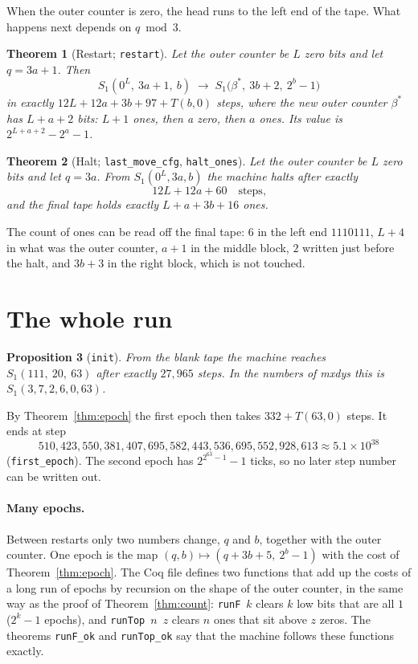 \documentclass[11pt]{article}
\newtheorem{theorem}{Theorem}
\newtheorem{proposition}[theorem]{Proposition}
\theoremstyle{remark}
\newcommand{\coq}[1]{\texttt{#1}}
\begin{document}
When the outer counter is zero, the head runs to the left end of the tape. What
happens next depends on $q \bmod 3$.

\begin{theorem}[Restart; \coq{restart}]\label{thm:restart}
Let the outer counter be $L$ zero bits and let $q = 3a+1$. Then
\[
S_1(0^{L},\ 3a+1,\ b) \;\longrightarrow\; S_1\bigl(\beta^{*},\ 3b+2,\ 2^{b}-1\bigr)
\]
in exactly $12L + 12a + 3b + 97 + T(b,0)$ steps, where the new outer counter
$\beta^{*}$ has $L+a+2$ bits: $L+1$ ones, then a zero, then $a$ ones. Its value
is $2^{L+a+2} - 2^{a} - 1$.
\end{theorem}

\begin{theorem}[Halt; \coq{last\_move\_cfg}, \coq{halt\_ones}]\label{thm:halt}
Let the outer counter be $L$ zero bits and let $q = 3a$. From $S_1(0^{L}, 3a, b)$
the machine halts after exactly
\[
12L + 12a + 60 \quad\text{steps,}
\]
and the final tape holds exactly $L + a + 3b + 16$ ones.
\end{theorem}

The count of ones can be read off the final tape: $6$ in the left end
$1110111$, $L+4$ in what was the outer counter, $a+1$ in the middle block, $2$
written just before the halt, and $3b+3$ in the right block, which is not
touched.

\section{The whole run}

\begin{proposition}[\coq{init}]\label{prop:init}
From the blank tape the machine reaches $S_1(111,\ 20,\ 63)$ after exactly
$27{,}965$ steps. In the numbers of mxdys this is $S_1(3,7,2,6,0,63)$.
\end{proposition}

By Theorem~\ref{thm:epoch} the first epoch then takes
$332 + T(63,0)$ steps. It ends at step
\[
510{,}423{,}550{,}381{,}407{,}695{,}582{,}443{,}536{,}695{,}552{,}928{,}613
\approx 5.1\times 10^{38}
\]
(\coq{first\_epoch}). The second epoch has $2^{2^{63}-1}-1$ ticks, so no later
step number can be written out.

\paragraph{Many epochs.} Between restarts only two numbers change, $q$ and $b$,
together with the outer counter. One epoch is the map
$(q,b)\mapsto(q+3b+5,\ 2^{b}-1)$ with the cost of Theorem~\ref{thm:epoch}. The
Coq file defines two functions that add up the costs of a long run of epochs by
recursion on the shape of the outer counter, in the same way as the proof of
Theorem~\ref{thm:count}: \coq{runF}~$k$ clears $k$ low bits that are all $1$
($2^{k}-1$ epochs), and \coq{runTop}~$n$~$z$ clears $n$ ones that sit above $z$
zeros. The theorems \coq{runF\_ok} and \coq{runTop\_ok} say that the machine
follows these functions exactly.
\end{document}
